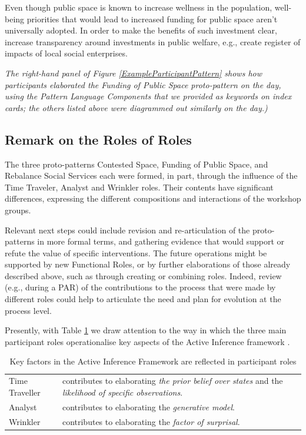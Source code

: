 \documentclass[acmlarge,timestamp]{acmart}
\begin{document}
Even though public space is known to increase wellness in the population, well-being priorities that would lead to increased funding for public space aren’t universally adopted.  In order to make the benefits of such investment clear, increase transparency around investments in public welfare, e.g., create register of impacts of local social enterprises.

\medskip

\noindent \emph{The right-hand panel of Figure
\ref{ExampleParticipantPattern} shows how participants elaborated the
    {\sc Funding of Public Space} proto-pattern on the day, using the
    {\sc Pattern Language Components} that we provided as keywords on
    index cards; the others listed above were diagrammed out similarly
    on the day.)}

\medskip

\subsection{Remark on the Roles of Roles}
The three proto-patterns {\sc Contested Space}, {\sc Funding of Public
  Space}, and {\sc Rebalance Social Services} each were formed, in
part, through the influence of the {\sc Time Traveler}, {\sc Analyst}
and {\sc Wrinkler} roles.  Their contents have significant
differences, expressing the different compositions and interactions of
the workshop groups.

Relevant next steps could include revision and re-articulation of the
proto-patterns in more formal terms, and gathering evidence that would
support or refute the value of specific interventions.  The future
operations might be supported by new {\sc Functional Roles}, or by
further elaborations of those already described above, such as through
creating or combining roles.  Indeed, review (e.g., during a PAR) of
the contributions to the process that were made by different roles
could help to articulate the need and plan for evolution at the
process level.

Presently, with Table \ref{active-inference-factors} we draw attention
to the way in which the three main participant roles operationalise
key aspects of the Active Inference framework \cite{SMITH2022102632}.

\begin{table}
\begin{tabular}{ll}
{\sc Time Traveller} & contributes to elaborating \emph{the prior
belief over states} and the \emph{likelihood of specific
observations}.\\

{\sc  Analyst} & contributes to elaborating the \emph{generative model}.\\

{\sc Wrinkler} & contributes to elaborating the \emph{factor of surprisal}.
\end{tabular}
\caption{Key factors in the Active Inference Framework are reflected in participant roles\label{active-inference-factors}}
\end{table}
\end{document}
